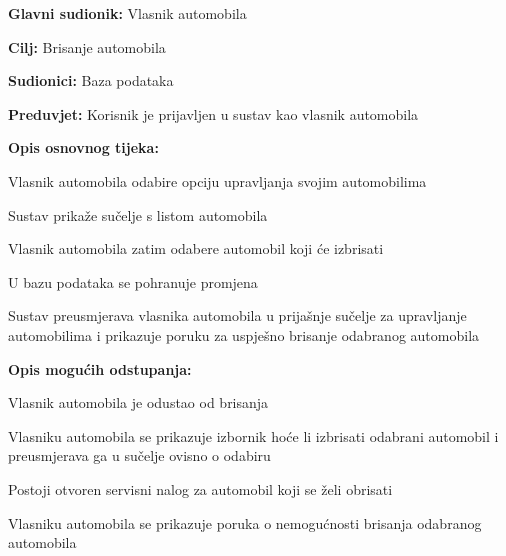 \noindent {}
\begin{packed_item}
	
	\item \textbf{Glavni sudionik: } Vlasnik automobila
	\item  \textbf{Cilj:} Brisanje automobila
	\item  \textbf{Sudionici:} Baza podataka
	\item  \textbf{Preduvjet:} Korisnik je prijavljen u sustav kao vlasnik automobila
	\item  \textbf{Opis osnovnog tijeka:}
	
	\item[] \begin{packed_enum}
		
		\item Vlasnik automobila odabire opciju upravljanja svojim automobilima
		\item Sustav prikaže sučelje s listom automobila
		\item Vlasnik automobila zatim odabere automobil koji će izbrisati
		\item U bazu podataka se pohranuje promjena
		\item Sustav preusmjerava vlasnika automobila u prijašnje sučelje za upravljanje
		automobilima i prikazuje poruku za uspješno brisanje odabranog automobila
		
	\end{packed_enum}
	\item  \textbf{Opis mogućih odstupanja:}
	
	\item[] \begin{packed_item}
		
		\item[3.a] Vlasnik automobila je odustao od brisanja
		\item[] \begin{packed_enum}
			
			\item Vlasniku automobila se prikazuje izbornik hoće li izbrisati odabrani
			automobil i preusmjerava ga u sučelje ovisno o odabiru
			
		\end{packed_enum}
		
		\item[3.b] Postoji otvoren servisni nalog za automobil koji se želi
		obrisati
		\item[] \begin{packed_enum}
			
			\item Vlasniku automobila se prikazuje poruka o nemogućnosti brisanja odabranog
			automobila
			
		\end{packed_enum}
		
	\end{packed_item}
	
\end{packed_item}

